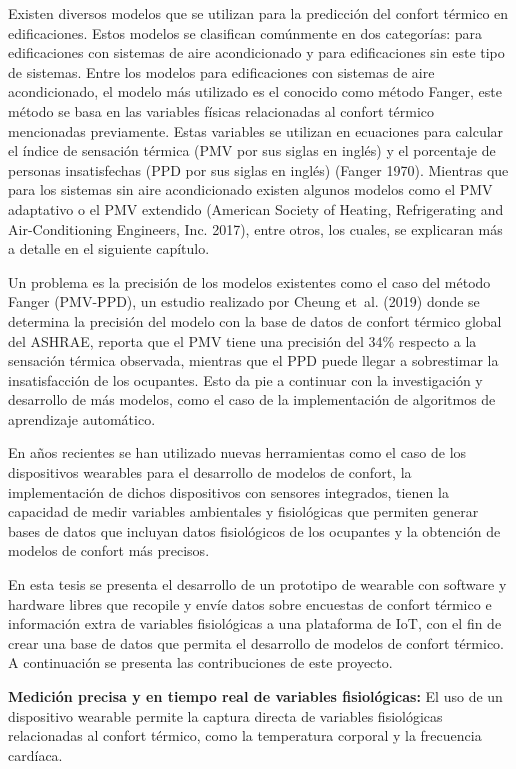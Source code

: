 \documentclass[
  letterpaper,
  DIV=11,
  numbers=noendperiod]{scrreport}
\begin{document}
Existen diversos modelos que se utilizan para la predicción del confort
térmico en edificaciones. Estos modelos se clasifican comúnmente en dos
categorías: para edificaciones con sistemas de aire acondicionado y para
edificaciones sin este tipo de sistemas. Entre los modelos para
edificaciones con sistemas de aire acondicionado, el modelo más
utilizado es el conocido como método Fanger, este método se basa en las
variables físicas relacionadas al confort térmico mencionadas
previamente. Estas variables se utilizan en ecuaciones para calcular el
índice de sensación térmica (PMV por sus siglas en inglés) y el
porcentaje de personas insatisfechas (PPD por sus siglas en inglés)
(Fanger 1970). Mientras que para los sistemas sin aire acondicionado
existen algunos modelos como el PMV adaptativo o el PMV extendido
(American Society of Heating, Refrigerating and Air-Conditioning
Engineers, Inc. 2017), entre otros, los cuales, se explicaran más a
detalle en el siguiente capítulo.

Un problema es la precisión de los modelos existentes como el caso del
método Fanger (PMV-PPD), un estudio realizado por Cheung et~al. (2019)
donde se determina la precisión del modelo con la base de datos de
confort térmico global del ASHRAE, reporta que el PMV tiene una
precisión del 34\% respecto a la sensación térmica observada, mientras
que el PPD puede llegar a sobrestimar la insatisfacción de los
ocupantes. Esto da pie a continuar con la investigación y desarrollo de
más modelos, como el caso de la implementación de algoritmos de
aprendizaje automático.

En años recientes se han utilizado nuevas herramientas como el caso de
los dispositivos wearables para el desarrollo de modelos de confort, la
implementación de dichos dispositivos con sensores integrados, tienen la
capacidad de medir variables ambientales y fisiológicas que permiten
generar bases de datos que incluyan datos fisiológicos de los ocupantes
y la obtención de modelos de confort más precisos.

En esta tesis se presenta el desarrollo de un prototipo de wearable con
software y hardware libres que recopile y envíe datos sobre encuestas de
confort térmico e información extra de variables fisiológicas a una
plataforma de IoT, con el fin de crear una base de datos que permita el
desarrollo de modelos de confort térmico. A continuación se presenta las
contribuciones de este proyecto.

\textbf{Medición precisa y en tiempo real de variables fisiológicas:} El
uso de un dispositivo wearable permite la captura directa de variables
fisiológicas relacionadas al confort térmico, como la temperatura
corporal y la frecuencia cardíaca.
\end{document}
